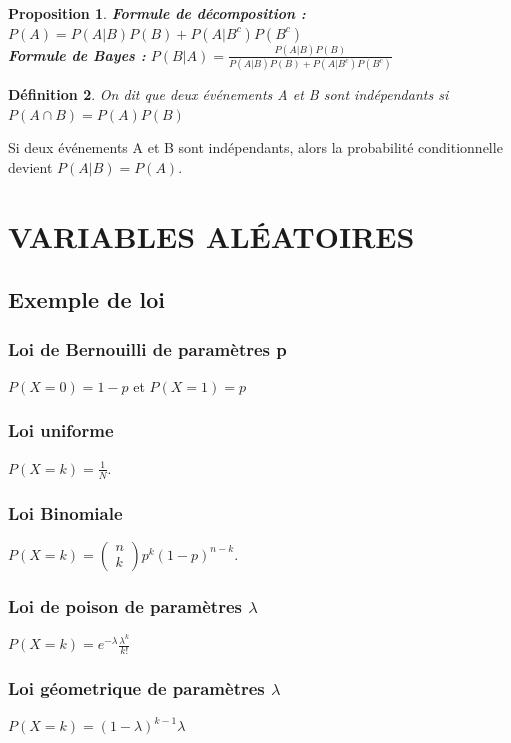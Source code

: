 \documentclass[a4paper, 12pt, french]{report}
\theoremstyle{break}
\newtheorem{defin}{Définition}[section]
\newtheorem{prop}[defin]{Proposition}
\begin{document}
\begin{prop}
\textbf{Formule de décomposition :} $P(A) = P(A | B)P(B) + P(A | B^{c}) P(B^{c})$ \\
\textbf{Formule de Bayes :} $ P(B | A) = \displaystyle\frac{P(A | B) P(B)}{P(A | B)P(B) + P(A | B^{c}) P(B^{c})}$
\end{prop}

\begin{defin}
On dit que deux événements A et B sont indépendants si $P(A \cap B) = P(A)P(B)$
\end{defin}
Si deux événements A et B sont indépendants, alors la probabilité conditionnelle devient $P(A|B)=P(A)$.

\chapter{VARIABLES ALÉATOIRES}
\section{Exemple de loi}
\subsection*{Loi de Bernouilli de paramètres p}
$P(X=0) = 1-p$ et $P(X=1)=p$

\subsection*{Loi uniforme}
$P(X = k)=\displaystyle\frac{1}{N}$.

\subsection*{Loi Binomiale}
$P(X=k)= \left(\begin{array}{c} n \\ k\end{array}\right) p^{k}(1-p)^{n-k}$.

\subsection*{Loi de poison de paramètres $\lambda$}
$P(X=k)=e^{-\lambda} \frac{\lambda^{k}}{k!}$

\subsection*{Loi géometrique de paramètres $\lambda$}
$P(X=k)=(1-\lambda)^{k-1}\lambda$
\end{document}
